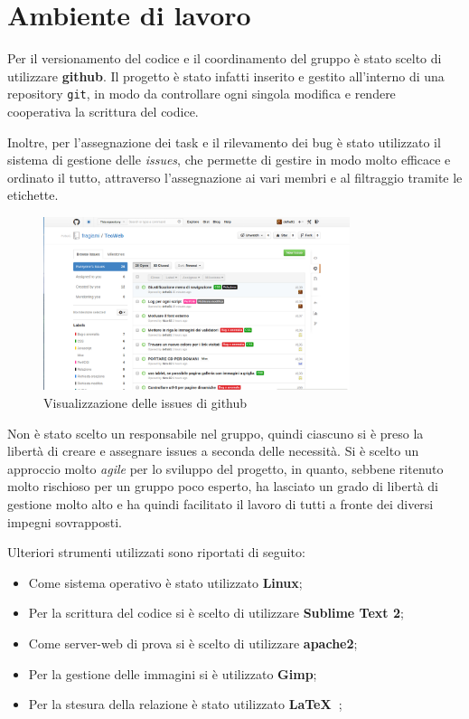 \section{Ambiente di lavoro}

Per il versionamento del codice e il coordinamento del gruppo è stato scelto di utilizzare \textbf{github}. Il progetto è stato infatti inserito e gestito all'interno di una repository \texttt{git}, in modo da controllare ogni singola modifica e rendere cooperativa la scrittura del codice.

Inoltre, per l'assegnazione dei task e il rilevamento dei bug è stato utilizzato il sistema di gestione delle \textit{issues}, che permette di gestire in modo molto efficace e ordinato il tutto, attraverso l'assegnazione ai vari membri e al filtraggio tramite le etichette.

\begin{figure}[H]
		\centering \includegraphics[width=0.8\textwidth]{images/github.png}
		\caption{Visualizzazione delle issues di github}
\end{figure}

Non è stato scelto un responsabile nel gruppo, quindi ciascuno si è preso la libertà di creare e assegnare issues a seconda delle necessità. Si è scelto un approccio molto \textit{agile} per lo sviluppo del progetto, in quanto, sebbene ritenuto molto rischioso per un gruppo poco esperto, ha lasciato un grado di libertà di gestione molto alto e ha quindi facilitato il lavoro di tutti a fronte dei diversi impegni sovrapposti.

Ulteriori strumenti utilizzati sono riportati di seguito:

\begin{itemize}

	\item Come sistema operativo è stato utilizzato \textbf{Linux};
	\item Per la scrittura del codice si è scelto di utilizzare \textbf{Sublime Text 2};
	\item Come server-web di prova si è scelto di utilizzare \textbf{apache2};
	\item Per la gestione delle immagini si è utilizzato \textbf{Gimp};
	\item Per la stesura della relazione è stato utilizzato \textbf{\LaTeX\ };

\end{itemize}


